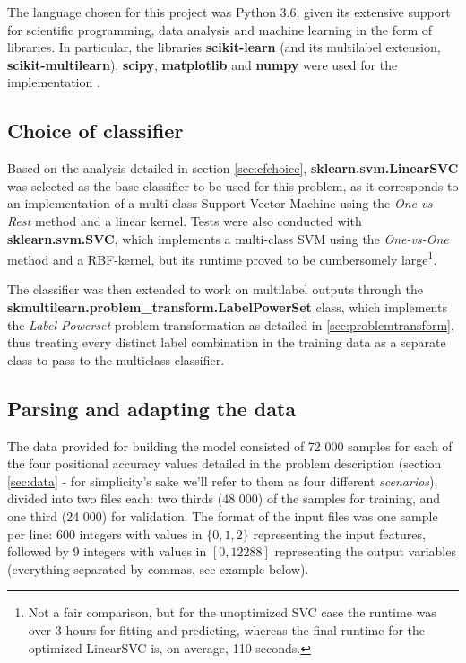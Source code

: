 \documentclass{kthreport}
\theoremstyle{definition}
\begin{document}
The language chosen for this project was Python 3.6, given its extensive support for scientific programming, data analysis and machine learning in the form of libraries. In particular, the libraries \textbf{scikit-learn} (and its multilabel extension, \textbf{scikit-multilearn}), \textbf{scipy}, \textbf{matplotlib} and \textbf{numpy} were used for the implementation \autocite{scikit-learn,scikit-multilearn,scipy,matplotlib,numpy}.

\subsection{Choice of classifier}

Based on the analysis detailed in section \ref{sec:cfchoice}, \textbf{sklearn.svm.LinearSVC} was selected as the base classifier to be used for this problem, as it corresponds to an implementation of a multi-class Support Vector Machine using the \emph{One-vs-Rest} method and a linear kernel. Tests were also conducted with \textbf{sklearn.svm.SVC}, which implements a multi-class SVM using the \emph{One-vs-One} method and a RBF-kernel, but its runtime proved to be cumbersomely large\footnote{Not a fair comparison, but for the unoptimized SVC case the runtime was over 3 hours for fitting and predicting, whereas the final runtime for the optimized LinearSVC is, on average, 110 seconds.}.

The classifier was then extended to work on multilabel outputs through the \textbf{skmultilearn.problem\_transform.LabelPowerSet} class, which implements the \emph{Label Powerset} problem transformation as detailed in \ref{sec:problemtransform}, thus treating every distinct label combination in the training data as a separate class to pass to the multiclass classifier.

\subsection{Parsing and adapting the data}

The data provided for building the model consisted of 72 000 samples for each of the four positional accuracy values detailed in the problem description (section \ref{sec:data} - for simplicity's sake we'll refer to them as four different \emph{scenarios}), divided into two files each: two thirds (48 000) of the samples for training, and one third (24 000) for validation. The format of the input files was one sample per line: 600 integers with values in $\{0, 1, 2\}$ representing the input features, followed by 9 integers with values in $[0, 12288]$ representing the output variables (everything separated by commas, see example below).
\end{document}
